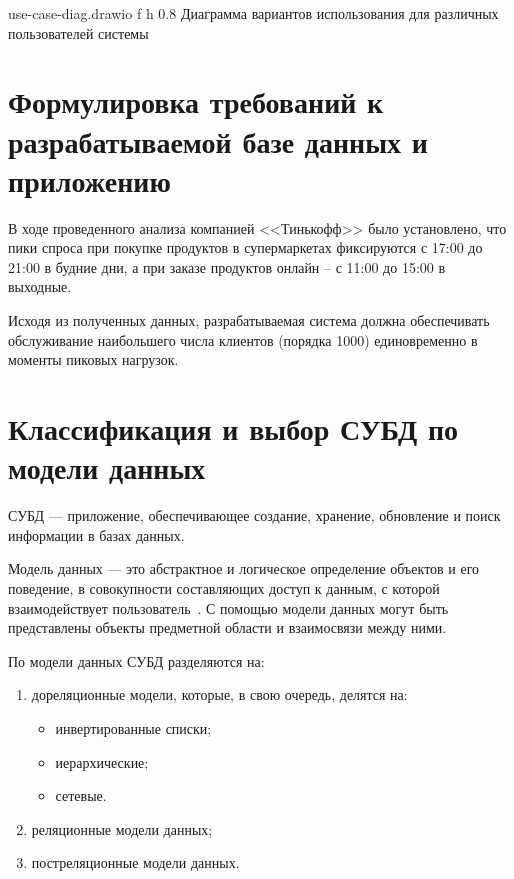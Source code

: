{use-case-diag.drawio} %
{f} %
{h} %
{0.8\textwidth} %
{Диаграмма вариантов использования для различных пользователей системы} %

\clearpage

\section{Формулировка требований к разрабатываемой базе данных и приложению}

В ходе проведенного анализа компанией <<Тинькофф>> \cite{info_time_of_purchase} было установлено, что пики спроса при покупке продуктов в супермаркетах фиксируются с 17:00 до 21:00 в будние дни, а при заказе продуктов онлайн -- с 11:00 до 15:00 в выходные.

Исходя из полученных данных, разрабатываемая система должна обеспечивать обслуживание наибольшего числа клиентов (порядка 1000) единовременно в моменты пиковых нагрузок.


\section{Классификация и выбор СУБД по модели данных}

СУБД --- приложение, обеспечивающее создание, хранение, обновление и поиск информации в базах данных.

Модель данных --- это абстрактное и логическое определение объектов и его поведение, в совокупности составляющих доступ к данным, с которой взаимодействует пользователь~\cite{info_intro_db_williams}. С помощью модели данных могут быть представлены объекты предметной области и взаимосвязи между ними.

По модели данных СУБД разделяются на:

\begin{enumerate}[label={\arabic*)}]
	\item дореляционные модели, которые, в свою очередь, делятся на:
	\begin{itemize}[label*=--]
		\item инвертированные списки;
		\item иерархические;
		\item сетевые.
	\end{itemize}
	\item реляционные модели данных;
	\item постреляционные модели данных.
\end{enumerate}

